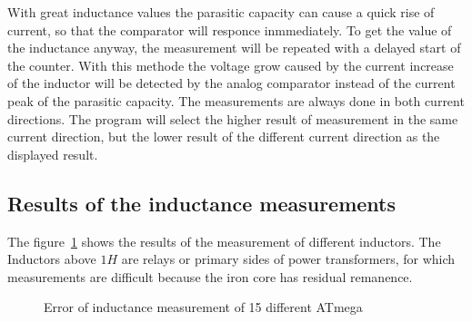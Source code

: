 With great inductance values the parasitic capacity can cause a quick rise of current, so that the comparator
will responce inmmediately.
To get the value of the inductance anyway, the measurement will be repeated with a delayed start of the counter.
With this methode the voltage grow caused by the current increase of the inductor will be detected by the
analog comparator instead of the current peak of the parasitic capacity.
The measurements are always done in both current directions.
The program will select the higher result of measurement in the same current direction, but the
lower result of the different current direction as the displayed result.

\subsection{Results of the inductance measurements}
The figure~\ref{fig:Induct328p} shows the results of the measurement of different inductors.
The Inductors above \(1 H\) are relays or primary sides of power transformers, for which
measurements are difficult because the iron core has residual remanence.


\begin{figure}[H]
\centering

\caption{Error of inductance measurement of 15 different ATmega}
\label{fig:Induct328p}
\end{figure}

